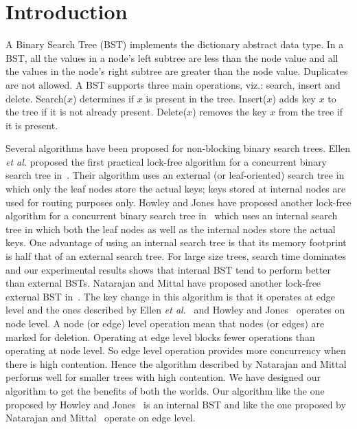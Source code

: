 \section{Introduction}
A Binary Search Tree (BST) implements the dictionary abstract data type. In a BST, all the values in a node's left subtree are less than the node value and all the values in the node's right subtree are greater than the node value. Duplicates are not allowed. A BST supports three main operations, viz.: search, insert and delete. Search($x$) determines if $x$ is present in the tree. Insert($x$) adds key $x$ to the tree if it is not already present. Delete($x$) removes the key $x$ from the tree if it is present. \par
Several algorithms have been proposed for non-blocking binary search trees. Ellen \textit{et al.} proposed the first practical lock-free algorithm for a concurrent binary search tree in~\cite{EllFat+:2010:PODC}. Their algorithm uses an external (or leaf-oriented) search tree in which only the leaf nodes store the actual keys; keys stored at internal nodes are used for routing purposes only. Howley and Jones have proposed another lock-free algorithm for a concurrent binary search tree in~\cite{HowJon:2012:SPAA} which uses an internal search tree in which both the leaf nodes as well as the internal nodes store the actual keys. One advantage of using an internal search tree is that its memory footprint is half that of an external search tree. For large size trees, search time dominates and our experimental results shows that internal BST tend to perform better than external BSTs. Natarajan and Mittal have proposed another lock-free external BST in~\cite{Natarajan:2014:PPOPP}. The key change in this algorithm is that it operates at edge level and the ones described by Ellen \textit{et al.}~\cite{EllFat+:2010:PODC} and Howley and Jones~\cite{HowJon:2012:SPAA}  operates on node level. A node (or edge) level operation mean that nodes (or edges) are marked for deletion. Operating at edge level blocks fewer operations than operating at node level. So edge level operation provides more concurrency when there is high contention. Hence the algorithm described by Natarajan and Mittal~\cite{Natarajan:2014:PPOPP} performs well for smaller trees with high contention. We have designed our algorithm to get the benefits of both the worlds. Our algorithm like the one proposed by Howley and Jones~\cite{HowJon:2012:SPAA} is an internal BST and like the one proposed by Natarajan and Mittal~\cite{Natarajan:2014:PPOPP} operate on edge level.